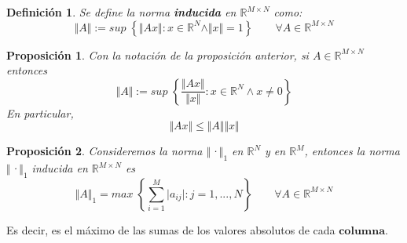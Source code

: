 \documentclass[10pt, a4paper]{article}
\theoremstyle{theorem-style}
\newtheorem{nprop}{Proposición}[section]
\theoremstyle{definition-style}
\newtheorem{ndef}{Definición}[section]
\theoremstyle{remark-style}
\theoremstyle{example-style}
\theoremstyle{definition-style}
\theoremstyle{remark-style}
\begin{document}
\begin{ndef}
Se define la norma \textbf{inducida} en $\mathbb{R}^{M \times N}$ como:
\[ \Vert A \Vert := sup \; \left\lbrace \Vert Ax \Vert : x \in \mathbb{R}^N \wedge \Vert x \Vert = 1 \right\rbrace \qquad \forall A \in \mathbb{R}^{M \times N} \]
\end{ndef}

\begin{nprop}
Con la notación de la proposición anterior, si $A \in \mathbb{R}^{M \times N}$ entonces
\[ \Vert A \Vert := sup \; \left\lbrace \frac{\Vert Ax \Vert}{\Vert x \Vert } : x \in \mathbb{R}^N \wedge x \neq 0 \right\rbrace \]
En particular,
\[ \Vert Ax \Vert \leq \Vert A \Vert \Vert x \Vert \]
\end{nprop}

\begin{nprop}
Consideremos la norma $\Vert$·$\Vert _1$ en $\mathbb{R}^N$ y en $\mathbb{R}^M$, entonces la norma $\Vert$·$\Vert _1$ inducida en $\mathbb{R}^{M \times N}$ es
\[ \Vert A \Vert _1 = max \; \left\lbrace \sum_{i=1}^M \vert a_{ij} \vert : j = 1,...,N \right\rbrace \qquad \forall A \in \mathbb{R}^{M \times N} \]
\end{nprop}

Es decir, es el máximo de las sumas de los valores absolutos de cada $\textbf{columna}$.
\end{document}
